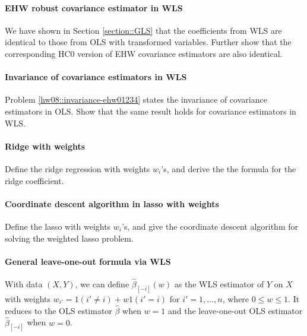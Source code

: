 \paragraph{EHW robust covariance estimator in WLS}\label{hw16::ehw-wls}

We have shown in Section \ref{section::GLS} that the coefficients from WLS are identical to those from OLS with transformed variables.
Further show that the corresponding HC0 version of EHW covariance estimators are
also identical. 

 
 
 \paragraph{Invariance of  covariance estimators in WLS}\label{hw16::invariance-cov-wls}

Problem \ref{hw08::invariance-ehw01234} states the invariance of covariance estimators in OLS. Show that the same result holds for covariance estimators in WLS. 
 
 


\paragraph{Ridge with weights}

Define the ridge regression with weights $w_{i}$'s, and derive the
the formula for the ridge coefficient. 

\paragraph{Coordinate descent algorithm in lasso with weights}

Define the lasso with weights $w_{i}$'s, and give the coordinate
descent algorithm for solving the weighted lasso problem. 



\paragraph{General leave-one-out formula via WLS}
\label{hw16::loo-wls}



With data $(X,Y)$, we can define $\hat{\beta}_{[-i]}(w)$ as the WLS estimator of $Y$ on $X$ with weights $w_{i'} = 1(i' \neq i) + w 1(i'=i)$ for $i' = 1,\ldots, n$, where $ 0\leq w \leq 1$.  It reduces to the OLS estimator $\hat\beta$ when $w=1$ and the leave-one-out OLS estimator $\hat{\beta}_{[-i]}$ when $w=0$. 

